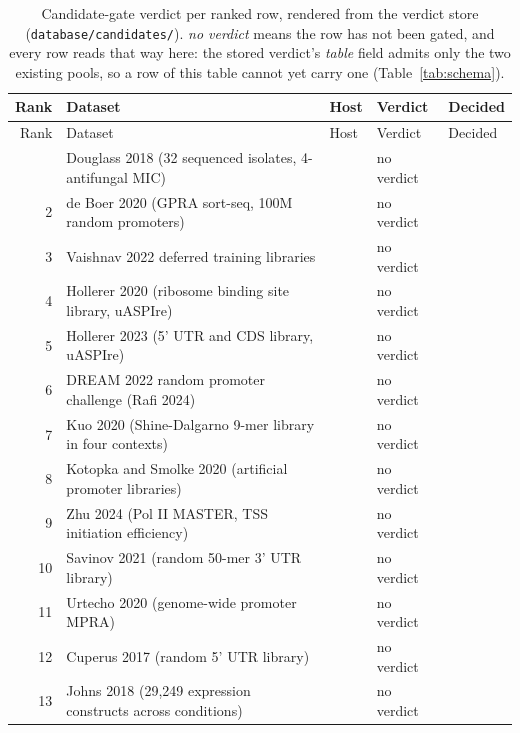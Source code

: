 \begingroup
\footnotesize
\begin{longtable}{@{}r L{76mm} L{20mm} L{36mm} L{24mm}@{}}
\caption[]{Candidate-gate verdict per ranked row, rendered from the verdict store
(\texttt{database/candidates/}). \emph{no verdict} means the row has not been gated, and
every row reads that way here: the stored verdict's \emph{table} field admits only the
two existing pools, so a row of this table cannot yet carry one
(Table~\ref{tab:schema}).}
\label{tab:verdicts}\\
\toprule
Rank & Dataset & Host & Verdict & Decided \\
\midrule
\endfirsthead
\toprule
Rank & Dataset & Host & Verdict & Decided \\
\midrule
\endhead
\bottomrule
{} & Douglass 2018 (32 sequenced isolates, 4-antifungal MIC) &  & no verdict &  \\
2 & de Boer 2020 (GPRA sort-seq, 100M random promoters) &  & no verdict &  \\
3 & Vaishnav 2022 deferred training libraries &  & no verdict &  \\
4 & Hollerer 2020 (ribosome binding site library, uASPIre) &  & no verdict &  \\
5 & Hollerer 2023 (5' UTR and CDS library, uASPIre) &  & no verdict &  \\
6 & DREAM 2022 random promoter challenge (Rafi 2024) &  & no verdict &  \\
7 & Kuo 2020 (Shine-Dalgarno 9-mer library in four contexts) &  & no verdict &  \\
8 & Kotopka and Smolke 2020 (artificial promoter libraries) &  & no verdict &  \\
9 & Zhu 2024 (Pol II MASTER, TSS initiation efficiency) &  & no verdict &  \\
10 & Savinov 2021 (random 50-mer 3' UTR library) &  & no verdict &  \\
11 & Urtecho 2020 (genome-wide promoter MPRA) &  & no verdict &  \\
12 & Cuperus 2017 (random 5' UTR library) &  & no verdict &  \\
13 & Johns 2018 (29,249 expression constructs across conditions) &  & no verdict &  \\

\end{longtable}
